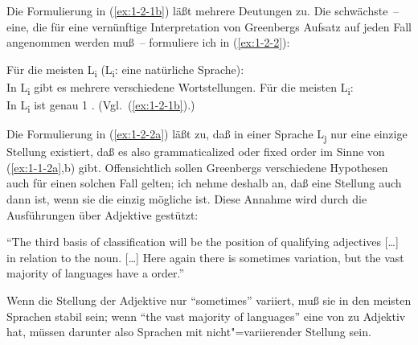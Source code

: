 \documentclass[output=paper]{langsci/langscibook}
\begin{document}
Die Formulierung in (\ref{ex:1-2-1b}) läßt mehrere Deutungen zu. Die schwächste~-- eine, die
für eine vernünftige Interpretation von Greenbergs Aufsatz auf jeden Fall angenommen werden muß~– formuliere ich in (\ref{ex:1-2-2}):
\begin{exe}
\ex\label{ex:1-2-2}
\begin{xlist}
\ex\label{ex:1-2-2a} Für die meisten L\textsubscript{i} (L\textsubscript{i}: eine natürliche Sprache): \\
In L\textsubscript{i} gibt es mehrere verschiedene Wortstellungen.
\ex\label{ex:1-2-2b} Für die meisten L\textsubscript{i}: \\
In L\textsubscript{i} ist genau 1  . (Vgl.\ (\ref{ex:1-2-1b}).)
\end{xlist}
\end{exe}
Die Formulierung in (\ref{ex:1-2-2a}) läßt zu, daß in einer Sprache L\textsubscript{j} nur eine einzige Stellung existiert, daß es also grammaticalized oder fixed order im Sinne von (\ref{ex:1-1-2a},b) gibt. Offensichtlich sollen Greenbergs verschiedene Hypothesen auch für einen solchen Fall gelten; ich nehme deshalb an, daß eine Stellung auch dann  ist, wenn sie die
einzig mögliche ist. Diese Annahme wird durch die Ausführungen über Adjektive
gestützt:
\begin{exe}
\ex\label{ex:1-2-3}
"`The third basis of classification will be the position of qualifying adjectives
[\ldots] in relation to the noun. [\ldots] Here again there is sometimes variation, but
the vast majority of languages have a  order."' \citep[77]{Greenberg1963}
\end{exe}
Wenn die Stellung der Adjektive nur "`sometimes"' variiert, muß sie in den meisten
Sprachen stabil sein; wenn "`the vast majority of languages"' eine 
von  zu Adjektiv hat, müssen darunter also Sprachen mit nicht"=variierender Stellung sein.
\end{document}
